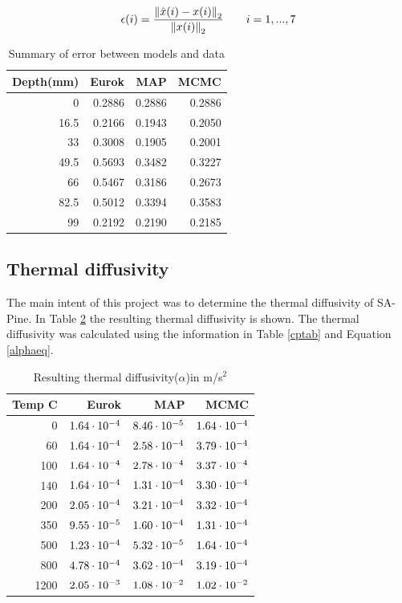 \begin{equation}\label{relerror}
\epsilon(i) = \frac{\left\lVert\hat{x}(i)-x(i) \right\rVert_2}{\left\lVert x(i)\right\rVert_2} \quad \quad i= 1, ... ,7
\end{equation}

\begin{table}[H] \label{errortab}
\centering
	\begin{tabular}{ r r r r }
	\toprule
	Depth(mm) & Eurok & MAP & MCMC\\
	\midrule
	0 & 0.2886 & 0.2886 & 0.2886\\
	16.5 & 0.2166 & \cellcolor{green!20}0.1943 & 0.2050\\
	33 & 0.3008   & \cellcolor{green!20} 0.1905 & 0.2001\\
	49.5 & 0.5693 & 0.3482 &\cellcolor{green!20} 0.3227\\
	66 & 0.5467   & 0.3186 & \cellcolor{green!20}0.2673\\
	82.5 & 0.5012 &\cellcolor{green!20} 0.3394 & 0.3583\\
	99 & 0.2192   & 0.2190 &\cellcolor{green!20} 0.2185\\
	\bottomrule	
	\end{tabular}
	\caption{Summary of error between models and data}
\end{table}

\subsection{Thermal diffusivity}
The main intent of this project was to determine the thermal diffusivity of SA-Pine. 
In Table \ref{diffrestab} the resulting thermal diffusivity is shown.
The thermal diffusivity was calculated using the information in Table \ref{cptab} and Equation \ref{alphaeq}.

\begin{table}[H] \label{diffrestab}
\centering
	\begin{tabular}{ r r r r }
	\toprule
	Temp \textdegree C & Eurok & MAP & MCMC\\
	\midrule
	0&   $1.64\cdot 10^{-4}$&	$8.46\cdot 10^{-5}$&	$1.64\cdot 10^{-4}$\\
	60&  $1.64\cdot 10^{-4}$&	$2.58\cdot 10^{-4}$&	$3.79\cdot 10^{-4}$\\
	100& $1.64\cdot 10^{-4}$&	$2.78\cdot 10^{-4}$&	$3.37\cdot 10^{-4}$\\\
	140& $1.64\cdot 10^{-4}$&	$1.31\cdot 10^{-4}$&	$3.30\cdot 10^{-4}$\\
	200& $2.05\cdot 10^{-4}$&	$3.21\cdot 10^{-4}$&	$3.32\cdot 10^{-4}$\\
	350& $9.55\cdot 10^{-5}$&	$1.60\cdot 10^{-4}$&	$1.31\cdot 10^{-4}$\\
	500& $1.23\cdot 10^{-4}$&	$5.32\cdot 10^{-5}$&	$1.64\cdot 10^{-4}$\\
	800& $4.78\cdot 10^{-4}$&	$3.62\cdot 10^{-4}$&	$3.19\cdot 10^{-4}$\\
	1200& $2.05\cdot 10^{-3}$&	$1.08\cdot 10^{-2}$&	$1.02\cdot 10^{-2}$\\
	\bottomrule	
	\end{tabular}
	\caption{Resulting thermal diffusivity($\alpha$)in m/s$^2$}
\end{table}






